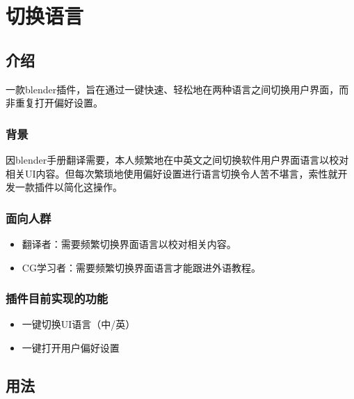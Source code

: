 \documentclass{resources/DocClass}
\begin{document}
    \maketitle
    \frontmatter
    
    
    {\centering \tableofcontents} %
    \mainmatter

    \chapter{切换语言}
    \section{介绍}
    一款blender插件，旨在通过一键快速、轻松地在两种语言之间切换用户界面，而非重复打开偏好设置。

    \subsection{背景}
    因blender手册翻译需要，本人频繁地在中英文之间切换软件用户界面语言以校对相关UI内容。但每次繁琐地使用偏好设置进行语言切换令人苦不堪言，索性就开发一款插件以简化这操作。

    \subsection{面向人群}
    \begin{itemize}
        \item 翻译者：需要频繁切换界面语言以校对相关内容。
        \item CG学习者：需要频繁切换界面语言才能跟进外语教程。
    \end{itemize}

    \subsection{插件目前实现的功能}
    \begin{itemize}
        \item 一键切换UI语言（中/英）
        \item 一键打开用户偏好设置
    \end{itemize}

    \section{用法}
\end{document}
